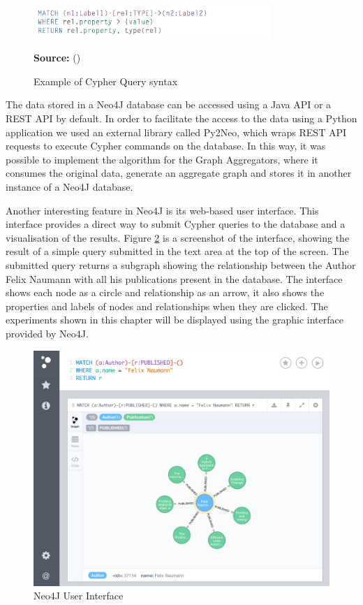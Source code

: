 \begin{figure}[ht]
\centering
\caption{Example of Cypher Query syntax}
\label{fig:figure30}
\includegraphics[width=0.8\textwidth]{images/cypher_general_syntax.png}
\par\medskip\ABNTEXfontereduzida\selectfont\textbf{Source:} \citeauthor{Neo4jCypher} (\citeyear{Neo4jCypher}) \par\medskip
\end{figure}

The data stored in a Neo4J database can be accessed using a Java API or a REST API by default. In order to facilitate the access to the data using a Python application we used an external library called Py2Neo, which wraps REST API requests to execute Cypher commands on the database. In this way, it was possible to implement the algorithm for the Graph Aggregators, where it consumes the original data, generate an aggregate graph and stores it in another instance of a Neo4J database.

Another interesting feature in Neo4J is its web-based user interface. This interface provides a direct way to submit Cypher queries to the database and a visualisation of the results. Figure \ref{fig:figure31} is a screenshot of the interface, showing the result of a simple query submitted in the text area at the top of the screen. The submitted query returns a subgraph showing the relationship between the Author Felix Naumann with all his publications present in the database. The interface shows each node as a circle and relationship as an arrow, it also shows the properties and labels of nodes and relationships when they are clicked. The experiments shown in this chapter will be displayed using the graphic interface provided by Neo4J.

\begin{figure}[ht]
\centering
\caption{Neo4J User Interface}
\label{fig:figure31}
\includegraphics[width=1\textwidth]{images/neo4j_user_interface.png}
\end{figure}


